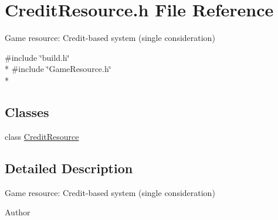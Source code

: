 \section{Credit\-Resource.\-h File Reference}
\label{_credit_resource_8h}


Game resource\-: Credit-\/based system (single consideration)  


{\ttfamily \#include \char`\"{}build.\-h\char`\"{}}\\*
{\ttfamily \#include \char`\"{}Game\-Resource.\-h\char`\"{}}\\*
\subsection*{Classes}
\begin{DoxyCompactItemize}
\item 
class \hyperlink{class_credit_resource}{Credit\-Resource}
\end{DoxyCompactItemize}


\subsection{Detailed Description}
Game resource\-: Credit-\/based system (single consideration) \begin{DoxyAuthor}{Author}

\end{DoxyAuthor}
